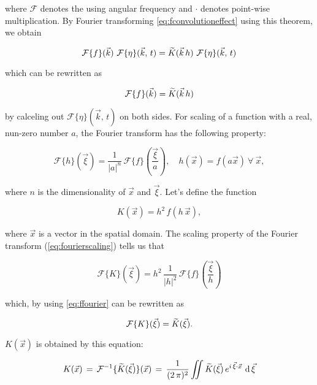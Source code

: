 where $\mathcal{F}$ denotes the  using angular frequency and $\cdot$ denotes point-wise multiplication. By Fourier transforming \eqref{eq:fconvolutioneffect} using this theorem, we obtain

\begin{equation}
\mathcal{F}\{f\}(\vec{k})\ \mathcal{F}\{\eta\}(\vec{k},\,t) = \fdfunc{K}(\vec{k}\,h)\ \mathcal{F}\{\eta\}(\vec{k},\,t)
\end{equation}

which can be rewritten as

\begin{equation} \label{eq:ffourier}
\mathcal{F}\{f\}(\vec{k}) = \widetilde{K}(\vec{k}\,h)
\end{equation}

by calceling out $\mathcal{F}\{\eta\}(\vec{k},\,t)$ on both sides. For scaling of a function with a real, nun-zero number $a$, the Fourier transform has the following property:

\begin{equation} \label{eq:fourierscaling}
\mathcal{F}\{h\}(\vec{\xi}) = \frac{1}{|a|^n}\,\mathcal{F}\{f\}\left(\frac{\vec{\xi}}{a}\right)
,\quad
h(\vec{x}) = f(a\vec{x})\ \forall\ \vec{x},
\end{equation}

where $n$ is the dimensionality of $\vec{x}$ and $\vec{\xi}$. Let's define the function

\begin{equation} \label{eq:ftokernel}
K(\vec{x}) = h^2\,f(h\,\vec{x}),
\end{equation}

where $\vec{x}$ is a  vector in the spatial domain. The scaling property of the Fourier transform (\eqref{eq:fourierscaling}) tells us that

\begin{equation}
\mathcal{F}\{K\}(\vec{\xi}) = h^2\,\frac{1}{|h|^2}\,\mathcal{F}\{f\}\left(\frac{\vec{\xi}}{h}\right)
\end{equation}

which, by using \eqref{eq:ffourier} can be rewritten as

\begin{equation}
\mathcal{F}\{K\}(\vec{\xi}) = \widetilde{K}(\vec{\xi}).
\end{equation}

$K(\vec{x})$ is obtained by  this equation:

\begin{equation} \label{eq:kernelfour2d}
K(\vec{x})\, = \,\mathcal{F}^{-1}\{\widetilde{K}(\vec{\xi})\}(\vec{x})\, = \,\frac{1}{(2\,\pi)^2}\int\!\!\!\!\int\widetilde{K}(\vec{\xi})\,e^{i\,\vec{\xi}\cdot\vec{x}}\,\operatorname{d}\vec{\xi}
\end{equation}


